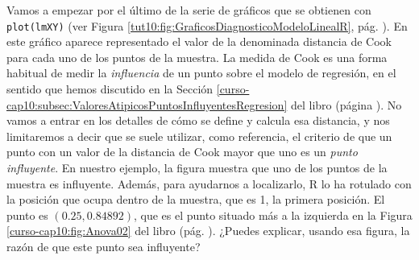 \documentclass[10pt,a4paper]{article}\usepackage[]{graphicx}\usepackage[]{color}
\begin{document}
Vamos a empezar por el último de la serie de gráficos que se obtienen con {\tt plot(lmXY)} (ver Figura \ref{tut10:fig:GraficosDiagnosticoModeloLinealR}, pág. \pageref{tut10:fig:GraficosDiagnosticoModeloLinealR}). En este gráfico aparece representado el valor de la denominada {\sf distancia de Cook} para cada uno de los puntos de la muestra. La medida de Cook es una forma habitual de medir la {\em influencia} de un punto sobre el modelo de regresión, en el sentido que hemos discutido en la Sección  \ref{curso-cap10:subsec:ValoresAtipicosPuntosInfluyentesRegresion} del libro (página
\pageref{curso-cap10:subsec:ValoresAtipicosPuntosInfluyentesRegresion}).  No vamos a entrar en los detalles de cómo se define y calcula esa distancia, y nos limitaremos a decir que se suele utilizar, como referencia, el criterio de que un punto con un valor de la distancia de Cook mayor que uno es un {\em punto influyente}. En nuestro ejemplo, la figura muestra que uno de los puntos de la muestra es influyente. Además, para ayudarnos a localizarlo, R lo ha rotulado con la posición que ocupa dentro de la muestra, que es 1, la primera posición. El punto es $(0.25, 0.84892)$, que es el punto situado más a la izquierda en la Figura \ref{curso-cap10:fig:Anova02} del libro (pág. \pageref{curso-cap10:fig:Anova02}). ¿Puedes explicar, usando esa figura, la razón de que este punto sea influyente?
\end{document}
